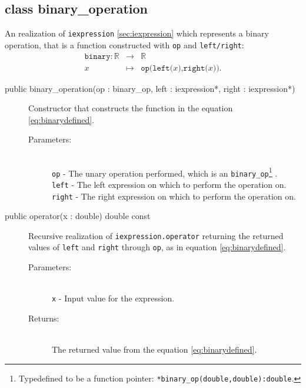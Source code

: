 \documentclass[a4paper,11pt]{kth-mag}
\newcommand{\RR}{\ensuremath{\mathbb{R}}}
\begin{document}
\subsection{class binary\_operation} An realization of \texttt{iexpression}
\ref{sec:iexpression} which represents a binary operation, that is a function
constructed with \texttt{op} and \texttt{left/right}:
\begin{eqnarray}
    \label{eq:binarydefined}
    \texttt{binary}: \RR &\rightarrow& \RR \nonumber \\
    x &\mapsto& \texttt{op(left(}x\texttt{),right(}x\texttt{))}.
\end{eqnarray}
\begin{description}
    \item[public binary\_operation(op : binary\_op, left : iexpression*, right :
    iexpression*)] Constructor that constructs the function in the equation
    \ref{eq:binarydefined}. 
    \begin{description}
        \item[Parameters:]~\\
            \verb+op+ - The unary operation performed, which is an
            \texttt{binary\_op}\footnote{Typedefined to
            be a function pointer: \texttt{*binary\_op(double,double):double}.} .\\
            \verb+left+ - The left expression on which to perform the
            operation on. \\
            \verb+right+ - The right expression on which to perform the
            operation on.
    \end{description}
\end{description}
\begin{description}
    \item[public operator(x : double) double const] 
    Recursive realization of \texttt{iexpression.operator} returning the
    returned values of \texttt{left} and \texttt{right} through \texttt{op},
    as in equation \ref{eq:binarydefined}.
    \begin{description}
        \item[Parameters:]~\\
            \verb+x+ - Input value for the expression.
        \item[Returns:]~\\
            The returned value from the equation \ref{eq:binarydefined}.
    \end{description}
\end{description}
\end{document}
